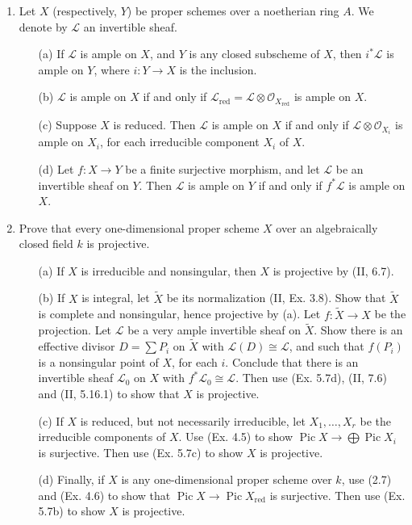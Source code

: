 \documentclass{article}
\newcommand{\fO}{\mathscr{O}}
\newcommand{\fL}{\mathscr{L}}
\DeclareMathOperator{\pic}{Pic}
\begin{document}
\begin{enumerate} [label=\textbf{\arabic*.}, leftmargin=0em]
\item Let $X$ (respectively, $Y$) be proper schemes over a noetherian ring $A$. We denote by $\mathscr{L}$ an invertible sheaf.
\begin{itemize}
  \item[(a)] If $\mathscr{L}$ is ample on $X$, and $Y$ is any closed subscheme of $X$, then $i^* \mathscr{L}$ is ample on $Y$, where $i : Y \to X$ is the inclusion.
  \item[(b)] $\mathscr{L}$ is ample on $X$ if and only if $\mathscr{L}_\text{red} = \mathscr{L} \otimes \fO_{X_\text{red}}$ is ample on $X$.
  \item[(c)] Suppose $X$ is reduced. Then $\mathscr{L}$ is ample on $X$ if and only if $\mathscr{L} \otimes \fO_{X_i}$ is ample on $X_i$, for each irreducible component $X_i$ of $X$.
  \item[(d)] Let $f : X \to Y$ be a finite surjective morphism, and let $\fL$ be an invertible sheaf on $Y$. Then $\fL$ is ample on $Y$ if and only if $f^* \mathscr{L}$ is ample on $X$.
\end{itemize}

\item Prove that every one-dimensional proper scheme $X$ over an algebraically closed field $k$ is projective.
\begin{itemize}
  \item[(a)] If $X$ is irreducible and nonsingular, then $X$ is projective by (II, 6.7).
  \item[(b)] If $X$ is integral, let $\tilde{X}$ be its normalization (II, Ex. 3.8). Show that $\tilde{X}$ is complete and nonsingular, hence projective by (a). Let $f : \tilde{X} \to X$ be the projection. Let $\fL$ be a very ample invertible sheaf on $\tilde{X}$. Show there is an effective divisor $D = \sum P_i$ on $\tilde{X}$ with $\fL(D) \cong \mathscr{L}$, and such that $f(P_i)$ is a nonsingular point of $X$, for each $i$. Conclude that there is an invertible sheaf $\fL_0$ on $X$ with $f^* \fL_0 \cong \mathscr{L}$. Then use (Ex. 5.7d), (II, 7.6) and (II, 5.16.1) to show that $X$ is projective.
  \item[(c)] If $X$ is reduced, but not necessarily irreducible, let $X_1, \dots, X_r$ be the irreducible components of $X$. Use (Ex. 4.5) to show $\pic{X} \to \bigoplus \pic{X_i}$ is surjective. Then use (Ex. 5.7c) to show $X$ is projective.
  \item[(d)] Finally, if $X$ is any one-dimensional proper scheme over $k$, use (2.7) and (Ex. 4.6) to show that $\pic{X} \to \pic{X_\text{red}}$ is surjective. Then use (Ex. 5.7b) to show $X$ is projective.
\end{itemize}


\end{enumerate}
\end{document}

